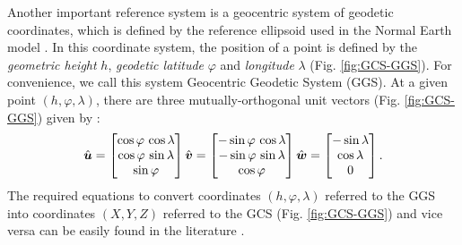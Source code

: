 \documentclass[extra]{gji}
\begin{document}
Another important reference system is a geocentric system of 
geodetic coordinates, which is defined by the reference ellipsoid 
used in the Normal Earth model \citep{heiskanen-moritz1967, soler1976, 
torge2012, bouman_etal2013}. 
In this coordinate system, the position of a point 
is defined by the \textit{geometric height} $h$, 
\textit{geodetic latitude} $\varphi$ and \textit{longitude} $\lambda$ (Fig. \ref{fig:GCS-GGS}).
For convenience, we call this system Geocentric Geodetic System
(GGS). 
At a given point $(h, \varphi, \lambda)$, there are three 
mutually-orthogonal unit vectors (Fig. \ref{fig:GCS-GGS}) given by \citep{soler1976}:
\begin{equation}
\hat{\mitbf{u}} = 
\begin{bmatrix}
\cos\varphi \, \cos\lambda \\
\cos\varphi \, \sin\lambda \\
\sin\varphi
\end{bmatrix}
\hat{\mitbf{v}} = 
\begin{bmatrix}
-\sin\varphi \, \cos\lambda \\
-\sin\varphi \, \sin\lambda \\
\cos\varphi
\end{bmatrix}
\hat{\mitbf{w}} = 
\begin{bmatrix}
-\sin\lambda \\
\cos\lambda \\
0
\end{bmatrix} .
\label{eq:unit-vectors}
\end{equation}
The required equations to convert coordinates $(h, \varphi, 
\lambda)$ referred to the GGS into coordinates $(X, Y, Z)$ referred to 
the GCS (Fig. \ref{fig:GCS-GGS}) and vice versa can be easily found in 
the literature \citep[e.g.,][]{heiskanen-moritz1967, torge2012, 
bouman_etal2013}.
\end{document}
